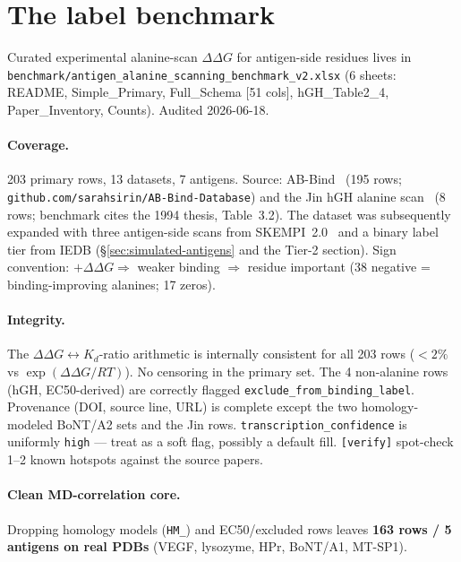 \section{The label benchmark}

Curated experimental alanine-scan $\Delta\Delta G$ for antigen-side residues lives in
\texttt{benchmark/antigen\_alanine\_scanning\_benchmark\_v2.xlsx} (6 sheets: README,
Simple\_Primary, Full\_Schema [51 cols], hGH\_Table2\_4, Paper\_Inventory, Counts). Audited
2026-06-18.

\paragraph{Coverage.} 203 primary rows, 13 datasets, 7 antigens. Source: AB-Bind~\cite{sirin2016}
(195 rows; \texttt{github.com/sarahsirin/AB-Bind-Database}) and the Jin hGH alanine
scan~\cite{jin1992} (8 rows; benchmark cites the 1994 thesis, Table~3.2). The dataset was
subsequently expanded with three antigen-side scans from SKEMPI~2.0~\cite{skempi2} and a binary
label tier from IEDB (\S\ref{sec:simulated-antigens} and the Tier-2 section).
Sign convention: $+\Delta\Delta G \Rightarrow$ weaker binding $\Rightarrow$ residue important
(38 negative = binding-improving alanines; 17 zeros).

\paragraph{Integrity.} The $\Delta\Delta G \leftrightarrow K_d$-ratio arithmetic is internally
consistent for all 203 rows ($<2\%$ vs $\exp(\Delta\Delta G/RT)$). No censoring in the primary set.
The 4 non-alanine rows (hGH, EC50-derived) are correctly flagged \texttt{exclude\_from\_binding\_label}.
Provenance (DOI, source line, URL) is complete except the two homology-modeled BoNT/A2 sets and the
Jin rows. \texttt{transcription\_confidence} is uniformly \texttt{high} --- treat as a soft flag,
possibly a default fill. \texttt{[verify]} spot-check 1--2 known hotspots against the source papers.

\paragraph{Clean MD-correlation core.} Dropping homology models (\texttt{HM\_}) and EC50/excluded
rows leaves \textbf{163 rows / 5 antigens on real PDBs} (VEGF, lysozyme, HPr, BoNT/A1, MT-SP1).
